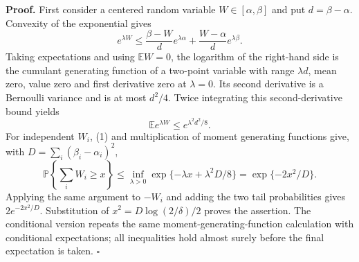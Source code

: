 \textbf{Proof.}
First consider a centered random variable \(W\in[\alpha,\beta]\) and put \(d=\beta-\alpha\). Convexity of the exponential gives
\[
e^{\lambda W}\le\frac{\beta-W}{d}e^{\lambda\alpha}+\frac{W-\alpha}{d}e^{\lambda\beta}.
\]
Taking expectations and using \(\mathbb EW=0\), the logarithm of the right-hand side is the cumulant generating function of a two-point variable with range \(\lambda d\), mean zero, value zero and first derivative zero at \(\lambda=0\). Its second derivative is a Bernoulli variance and is at most \(d^2/4\). Twice integrating this second-derivative bound yields
\[
\mathbb E e^{\lambda W}\le e^{\lambda^2d^2/8}.
\tag{1}
\]
For independent \(W_i\), (1) and multiplication of moment generating functions give, with \(D=\sum_i(\beta_i-\alpha_i)^2\),
\[
\mathbb P\!\left\{\sum_iW_i\ge x\right\}
\le\inf_{\lambda>0}\exp\{-\lambda x+\lambda^2D/8\}
=\exp\{-2x^2/D\}.
\]
Applying the same argument to \(-W_i\) and adding the two tail probabilities gives \(2e^{-2x^2/D}\). Substitution of \(x^2=D\log(2/\delta)/2\) proves the assertion. The conditional version repeats the same moment-generating-function calculation with conditional expectations; all inequalities hold almost surely before the final expectation is taken. \(\square\)